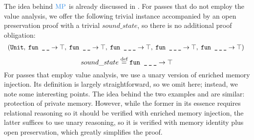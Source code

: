 The idea behind $\MPRED$ is already discussed in .
For passes that do not employ the value analysis, we offer the following trivial instance accompanied by an open preservation proof with a trivial $sound\_state$,
so there is no additional proof obligation:
\[
\begin{array}{l@{}l}
(
&\code{Unit},\;
\code{fun \_\,\_} \rightarrow \top, \;
\code{fun \_\,\_} \rightarrow \top, \;
\code{fun \_\,\_\,\_} \rightarrow \top, \;
\code{fun \_\,\_\,\_} \rightarrow \top, \;
\code{fun \_\,\_\,\_} \rightarrow \top) \;
\end{array}
\]
\[
sound\_state \stackrel{\text{def}}{=} \texttt{fun \_\,\_\,\_} \rightarrow \top
\]
For passes that employ value analysis, we use a unary version of enriched memory injection.
Its definition is largely straightforward, so we omit here; instead, we note some interesting points.
The idea behind the two examples  and  are similar: protection of private memory.
However, while the former in its essence requires relational reasoning so it should be verified with enriched memory injection,
the latter suffices to use unary reasoning, so it is verified with memory identity plus open preservation, which greatly simplifies the proof.



